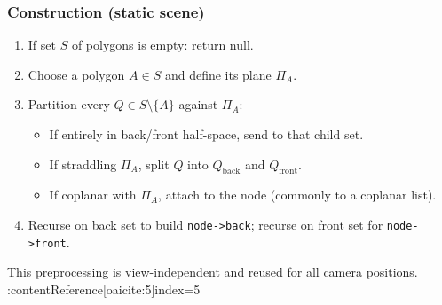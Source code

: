 \documentclass[10pt,twocolumn]{extarticle}
\begin{document}
\subsubsection*{Construction (static scene)}
\begin{enumerate}
  \item If set $S$ of polygons is empty: return null.
  \item Choose a polygon $A\in S$ and define its plane $\Pi_A$.
  \item Partition every $Q\in S\setminus\{A\}$ against $\Pi_A$:
    \begin{itemize}
      \item If entirely in back/front half-space, send to that child set.
      \item If straddling $\Pi_A$, split $Q$ into $Q_\text{back}$ and $Q_\text{front}$.
      \item If coplanar with $\Pi_A$, attach to the node (commonly to a coplanar list).
    \end{itemize}
  \item Recurse on back set to build \texttt{node->back}; recurse on front set for \texttt{node->front}.
\end{enumerate}
This preprocessing is view-independent and reused for all camera positions. :contentReference[oaicite:5]{index=5}
\end{document}
